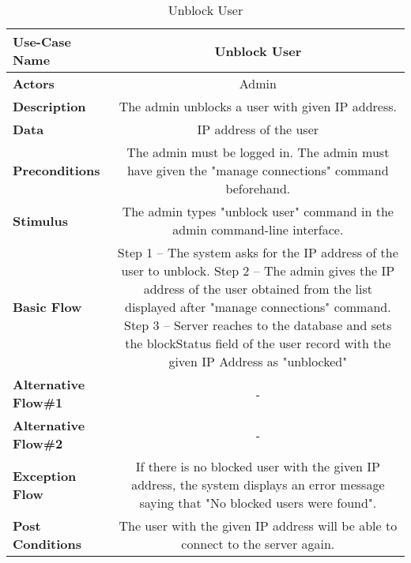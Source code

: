 \begin{table}[H]
     \centering
     \begin{tabular}{|l|C|}
         \hline
          \textbf{Use-Case Name} & Unblock User \\
         \hline
          \textbf{Actors} & Admin \\ 
         \hline
          \textbf{Description} & The admin unblocks a user with given IP address. \\ 
         \hline
          \textbf{Data} & IP address of the user\\ 
         \hline
          \textbf{Preconditions} & 
          The admin must be logged in. \newline
          The admin must have given the "manage connections" command beforehand.\\
         \hline
          \textbf{Stimulus} & The admin types "unblock user" command in the admin command-line interface.\\ 
         \hline
          \textbf{Basic Flow} & 
          Step 1 -- The system asks for the IP address of the user to unblock. \newline
          Step 2 -- The admin gives the IP address of the user obtained from the list displayed after "manage connections" command. \newline
          Step 3 -- Server reaches to the database and sets the blockStatus field of the user record with the given IP Address as "unblocked" \\
         \hline
          \textbf{Alternative Flow\#1} & -\\
         \hline
          \textbf{Alternative Flow\#2} & - \\
         \hline
          \textbf{Exception Flow} & If there is no blocked user with the given IP address, the system displays an error message saying that "No blocked users were found". \\
         \hline
          \textbf{Post Conditions} & The user with the given IP address will be able to connect to the server again. \\ 
         \hline
     \end{tabular}
     \caption{Unblock User}
     \label{tab:unblock_user}
 \end{table}